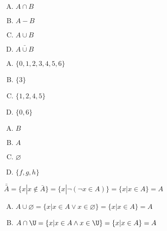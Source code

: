 {{        %
        \begin{practices}
            \begin{enumerate}[A.]
                \item $A \cap B$
                \item $A - B$
                \item $A \cup B$
                \item $\bar{A \cup B}$
            \end{enumerate}
        \end{practices}

        \begin{practices}
            \begin{enumerate}[A.]
                \item $\{0, 1, 2, 3, 4, 5, 6\}$
                \item $\{3\}$
                \item $\{1, 2, 4, 5\}$
                \item $\{0, 6\}$
            \end{enumerate}
        \end{practices}

        \begin{practices}
            \begin{enumerate}[A.]
                \item $B$
                \item $A$
                \item $\varnothing$
                \item $\{f, g, h\}$
            \end{enumerate}
        \end{practices}

        \begin{practices}
            $\bar{\bar{A}} = \{x | x \notin \bar{A}\} = \{x | \neg (\neg x \in A)\} = \{x | x \in A\} = A$
        \end{practices}

        \begin{practices}
            \begin{enumerate}[A.]
                \item $A \cup \varnothing = \{x | x \in A \vee x \in \varnothing\} = \{x | x \in A\} = A$
                \item $A \cap \U = \{x | x \in A \wedge x \in \U\} = \{x | x \in A\} = A$
            \end{enumerate}
        \end{practices}

}}

